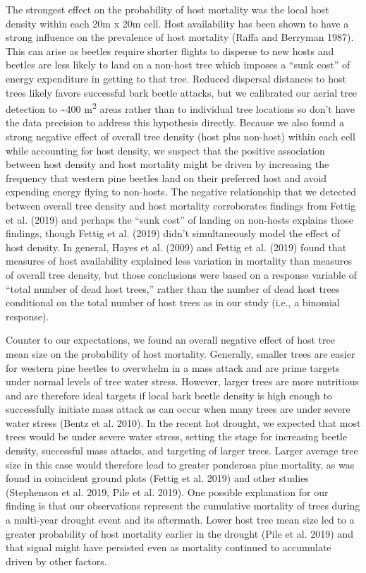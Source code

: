 \documentclass[]{article}
\begin{document}
The strongest effect on the probability of host mortality was the local
host density within each 20m x 20m cell. Host availability has been
shown to have a strong influence on the prevalence of host mortality
(Raffa and Berryman 1987). This can arise as beetles require shorter
flights to disperse to new hosts and beetles are less likely to land on
a non-host tree which imposes a ``sunk cost'' of energy expenditure in
getting to that tree. Reduced dispersal distances to host trees likely
favors successful bark beetle attacks, but we calibrated our aerial tree
detection to \textasciitilde{}400 m\textsuperscript{2} areas rather than
to individual tree locations so don't have the data precision to address
this hypothesis directly. Because we also found a strong negative effect
of overall tree density (host plus non-host) within each cell while
accounting for host density, we suspect that the positive association
between host density and host mortality might be driven by increasing
the frequency that western pine beetles land on their preferred host and
avoid expending energy flying to non-hosts. The negative relationship
that we detected between overall tree density and host mortality
corroborates findings from Fettig et al. (2019) and perhaps the ``sunk
cost'' of landing on non-hosts explains those findings, though Fettig et
al. (2019) didn't simultaneously model the effect of host density. In
general, Hayes et al. (2009) and Fettig et al. (2019) found that
measures of host availability explained less variation in mortality than
measures of overall tree density, but those conclusions were based on a
response variable of ``total number of dead host trees,'' rather than
the number of dead host trees conditional on the total number of host
trees as in our study (i.e., a binomial response).

Counter to our expectations, we found an overall negative effect of host
tree mean size on the probability of host mortality. Generally, smaller
trees are easier for western pine beetles to overwhelm in a mass attack
and are prime targets under normal levels of tree water stress. However,
larger trees are more nutritious and are therefore ideal targets if
local bark beetle density is high enough to successfully initiate mass
attack as can occur when many trees are under severe water stress (Bentz
et al. 2010). In the recent hot drought, we expected that most trees
would be under severe water stress, setting the stage for increasing
beetle density, successful mass attacks, and targeting of larger trees.
Larger average tree size in this case would therefore lead to greater
ponderosa pine mortality, as was found in coincident ground plots
(Fettig et al. 2019) and other studies (Stephenson et al. 2019, Pile et
al. 2019). One possible explanation for our finding is that our
observations represent the cumulative mortality of trees during a
multi-year drought event and its aftermath. Lower host tree mean size
led to a greater probability of host mortality earlier in the drought
(Pile et al. 2019) and that signal might have persisted even as
mortality continued to accumulate driven by other factors.
\end{document}
